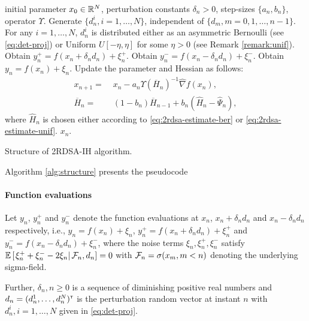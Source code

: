 \documentclass[twocolumn]{IEEEtran}
\begin{document}
\begin{algorithm}[t]
\begin{algorithmic}
initial parameter $x_0 \in \mathbb{R}^N$, perturbation constants $\delta_n>0$, step-sizes $\{a_n, b_n\}$, operator $\Upsilon$.
	\State Generate $\{d_n^{i}, i=1,\ldots,N\}$, independent of $\{d_m, m=0,1,\ldots,n-1\}$. 
	\State For any $i=1,\ldots,N$, $d_n^{i}$ is distributed either as an asymmetric Bernoulli (see \eqref{eq:det-proj}) or Uniform $U[-\eta,\eta]$ for some $\eta >0$ (see Remark \ref{remark:unif}). 
	\PEval
	    \State Obtain $y_n^+ = f(x_n+\delta_n d_n) + \xi_n^+$.
  \EndPEval
	    \PEvalPrime
	    \State Obtain $y_n^- = f(x_n-\delta_n d_n) + \xi_n^-$.
	    \EndPEvalPrime
	    	    \PEvalPrimeDouble
	    \State Obtain $y_n = f(x_n) + \xi_n$.
	    \EndPEvalPrimeDouble
	    \PImpNewton
		\State Update the parameter and Hessian as follows:
		\begin{align*}
		x_{n+1} = & \; x_n - a_n \Upsilon(\overline H_n)^{-1}\widehat\nabla f(x_n), \\
\overline H_n = &\; (1-b_{n})  \overline H_{n-1} + b_{n} ( \widehat H_n - \widehat \Psi_n),
\end{align*}
where $\widehat H_n$ is chosen either according to \eqref{eq:2rdsa-estimate-ber} or \eqref{eq:2rdsa-estimate-unif}.
		\EndPImpNewton
\EndFor
{} $x_n.$
\end{algorithmic}
\caption{Structure of 2RDSA-IH algorithm.}
\label{alg:structure}
\end{algorithm}

Algorithm \ref{alg:structure} presents the pseudocode
\paragraph{\textbf{Function evaluations}}
Let $y_n$, $y_n^+$ and $y_n^-$ denote the function evaluations at $x_n$, $x_n+\delta_n d_n$ and $x_n - \delta_n d_n$ respectively, i.e., 
$y_n = f(x_n) + \xi_n$, $y_n^+ = f(x_n+\delta_n d_n) + \xi_n^+$ and 
$y_n^- = f(x_n-\delta_n d_n) + \xi_n^-$,
where the noise terms $\xi_n, \xi_n^+, \xi_n^-$ satisfy $\mathbb{E}\left[\left.\xi_n^+ + \xi_n^- - 2\xi_n \right| \mathcal{F}_n, d_n\right] = 0$ with $\mathcal{F}_n = \sigma(x_m,m < n)$ denoting the underlying sigma-field.

Further, $\delta_n, n\geq 0$ is a sequence of diminishing positive real numbers and $d_n = (d_n^1,\ldots,d_n^N)^\mathsf{\scriptscriptstyle T}$ is the perturbation random vector at instant $n$ with $d_n^i,i=1,\ldots,N$ given in \eqref{eq:det-proj}.  
\end{document}
